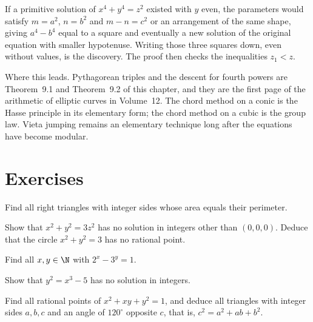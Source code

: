 \begin{examplex}
If a primitive solution of $x^4+y^4=z^2$ existed with $y$ even, the parameters would satisfy $m=a^2$, $n=b^2$ and $m-n=c^2$ or an arrangement of the same shape, giving $a^4-b^4$ equal to a square and eventually a new solution of the original equation with smaller hypotenuse. Writing those three squares down, even without values, is the discovery. The proof then checks the inequalities $z_1<z$.
\end{examplex}

\begin{beauty}
Where this leads. Pythagorean triples and the descent for fourth powers are Theorem~9.1 and Theorem~9.2 of this chapter, and they are the first page of the arithmetic of elliptic curves in Volume~12. The chord method on a conic is the Hasse principle in its elementary form; the chord method on a cubic is the group law. Vieta jumping remains an elementary technique long after the equations have become modular.
\end{beauty}

\section{Exercises}

\begin{exercise}[$\star$]\label{ex:areaper}
Find all right triangles with integer sides whose area equals their perimeter.
\end{exercise}

\begin{exercise}[$\star$]\label{ex:x2y23z2}
Show that $x^2+y^2=3z^2$ has no solution in integers other than $(0,0,0)$. Deduce that the circle $x^2+y^2=3$ has no rational point.
\end{exercise}

\begin{exercise}[$\star$]\label{ex:catalan23}
Find all $x,y\in\N$ with $2^x-3^y=1$.
\end{exercise}

\begin{exercise}[$\star\star$]\label{ex:mordell5}
Show that $y^2=x^3-5$ has no solution in integers.
\end{exercise}

\begin{exercise}[$\star\star$]\label{ex:eisentri}
Find all rational points of $x^2+xy+y^2=1$, and deduce all triangles with integer sides $a,b,c$ and an angle of $120^\circ$ opposite $c$, that is, $c^2=a^2+ab+b^2$.
\end{exercise}


